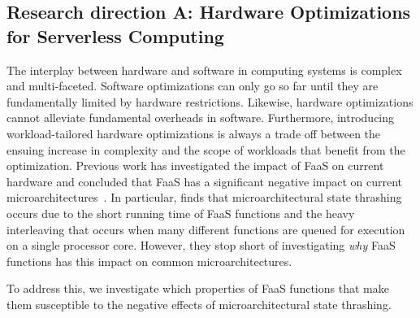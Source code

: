 \documentclass[../main.tex]{subfiles}
\begin{document}
\begin{refsection}
\subsection{Research direction A: Hardware Optimizations for Serverless Computing}
\label{sec:rda}

The interplay between hardware and software in computing systems is
complex and multi-faceted. Software optimizations can only go so far
until they are fundamentally limited by hardware
restrictions. Likewise, hardware optimizations cannot alleviate
fundamental overheads in software. Furthermore, introducing
workload-tailored hardware optimizations is always a trade off between
the ensuing increase in complexity and the scope of workloads that
benefit from the optimization. Previous work has investigated the
impact of FaaS on current hardware and concluded that FaaS has a
significant negative impact on current
microarchitectures~\cite{shahrad19_archit_implic_funct_servic_comput,lukewarm_serverless}. In
particular, \textcite{lukewarm_serverless} finds that
microarchitectural state thrashing occurs due to the short running
time of FaaS functions and the heavy interleaving that occurs when many
different functions are queued for execution on a single processor core. However, they stop short of investigating \emph{why} FaaS
functions has this impact on common microarchitectures.

To address this, we investigate which properties of FaaS functions
that make them susceptible to the negative effects of
microarchitectural state thrashing.




\end{refsection}
\end{document}
